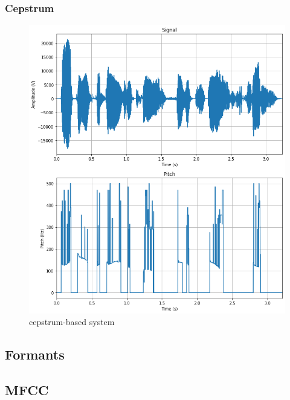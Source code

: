\documentclass[]{article}
\begin{document}
\subsubsection{Cepstrum}


\begin{figure}[h]
    \centering
    \includegraphics[scale=0.5]{images/cepstrum_pitch.png}
    \caption{\label{cepstrum}cepstrum-based system}
\end{figure}

\subsection{Formants}


\subsection{MFCC}




\end{document}
